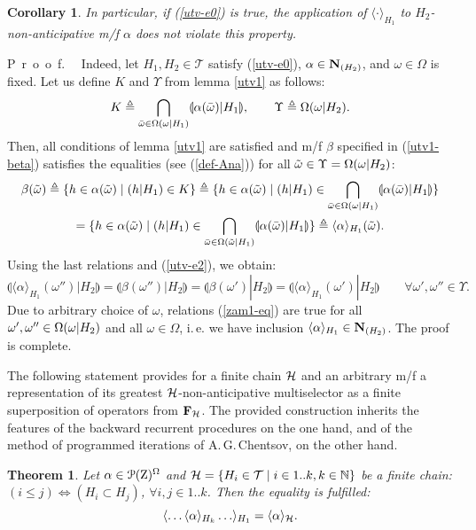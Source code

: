 \documentclass[sn-mathphys,Numbered,pdflatex]{sn-jnl}%
\theoremstyle{thmstyleone}%
\newtheorem{theorem}{Theorem}%
\theoremstyle{thmstyletwo}%
\theoremstyle{thmstylethree}%
\newtheorem{cor}{Corollary}
\renewcommand{\proof}{\par\mbox{P r o o f.}\ \ }
\newcommand{\nint}[2]{{{#1}..{#2}}}%
\renewcommand{\le}{\leqslant}%
\newcommand{\beq}{\begin{equation}}
\newcommand{\eeq}{\end{equation}}
\newcommand{\mydef}{\mathrel{\triangleq}}%
\newcommand{\icP}[1]{\EuScript{P}({#1})}%
\newcommand{\res}[2]{\ensuremath{(#1|#2)}}%
\newcommand{\myimp}{\ensuremath{\mathrel{\Rightarrow}}}%
\newcommand{\myeqv}{\ensuremath{\mathrel{\Leftrightarrow}}}%
\newcommand{\NA}{\ensuremath{\mathbb N}}%
\newcommand{\naOm}{\ensuremath{\Omega}}%
\newcommand{\naZ}{\ensuremath{\mathrm{Z}}}%
\newcommand{\naTc}{\ensuremath{\mathcal{T}}}%
\newcommand{\naOmo}[2]{\naOm\setbox0=\hbox{\text{$#1$}}\ifdim\wd0=0pt\else\res{#1}{#2}\fi}%
\newcommand{\AnaN}[2]{\mathbf{N}_{(#1)}\setbox0=\hbox{\text{$#2$}}\ifdim\wd0=0pt\else\left[{#2}\right]\fi}%
\newcommand{\sres}[2]{\llparenthesis#1|#2\rrparenthesis}%
\newcommand{\Ana}[2]{\ensuremath{\langle{#1}\rangle_{#2}}}%
\newcommand{\fref}[1]{{\rm(\ref{#1})}}   %
\begin{document}
\bigskip

\begin{cor}\label{zam1}
In particular, if \fref{utv-e0} is true, the application of $\Ana\cdot{H_1}$ to $H_2$-non-anticipative m/f $\alpha$ does not violate this property.%
\end{cor}

\proof
Indeed, let $H_1,H_2\in\naTc$ satisfy \fref{utv-e0}, $\alpha\in\AnaN{H_2}{}$, and $\omega\in\naOm$ is fixed.
Let us define $K$ and $\Upsilon$ from lemma \ref{utv1} as follows:
$$
K\mydef\bigcap_{\bar\omega\in\naOmo\omega{H_1}}\sres{\alpha(\bar\omega)}{H_1},\qquad\Upsilon\mydef\naOmo\omega{H_2}.
$$
Then, all conditions of lemma \ref{utv1} are satisfied and m/f $\beta$ specified in \fref{utv1-beta} satisfies the equalities (see \fref{def-Ana}) for all $\tilde\omega\in\Upsilon=\naOmo\omega{H_2}$:
\begin{multline*}
\beta(\tilde\omega)\mydef\{h\in\alpha(\tilde\omega)\mid\res h{H_1}\in K\}\mydef\{h\in\alpha(\tilde\omega)\mid\res h{H_1}\in\bigcap_{\bar\omega\in\naOmo{\omega}{H_1}}\sres{\alpha (\bar\omega)}{H_1}\}\\
=\{h\in\alpha(\tilde\omega)\mid\res h{H_1}\in\bigcap_{\bar\omega\in\naOmo{\tilde\omega}{H_1}}\sres{\alpha (\bar\omega)}{H_1}\}\mydef\Ana\alpha{H_1}(\tilde\omega).
\end{multline*}
Using the last relations and  \fref{utv-e2}, we obtain:
\beq\label{zam1-eq}
\sres{\Ana{\alpha}{H_1}(\omega'')}{H_2}=\sres{\beta(\omega'')}{H_2}=\sres{\beta(\omega')}{H_2}= \sres{\Ana{\alpha}{H_1}(\omega')}{H_2}\qquad\forall\omega',\omega''\in\Upsilon.
\eeq
Due to arbitrary choice of $\omega$, relations \fref{zam1-eq} are true for all $\omega',\omega''\in\naOmo\omega{H_2}$ and all $\omega\in\naOm$, i.\,e. we have inclusion $\Ana{\alpha}{H_1}\in\AnaN{H_2}{}$.
The proof is complete.

\bigskip

The following statement provides for a finite chain ${\cal H}$ and an arbitrary m/f a representation of its greatest ${\cal H}$-non-anticipative multiselector as a finite superposition of operators from ${\bf F}_{\cal H}$.
The provided construction inherits the features of the backward recurrent procedures \cite{NNK:143et,Pontr1967et,Pshenichny:1969et} on the one hand, and of the method of programmed iterations of A.\,G.\,Chentsov, on the other hand.

\begin{theorem}
\label{fix-to-couple-lem}
Let $\alpha\in\icP{\naZ}^\naOm$ and ${\cal H}=\{H_i\in\naTc\mid i\in\nint1k, k\in\NA\}$ be a finite chain: $(i\le j)\myeqv(H_i\subset H_j)$, $\forall i,j\in\nint1k$.
Then the equality is fulfilled:
\beq\label{fix-to-fin}
\Ana{\ldots\Ana\alpha{H_k}\ldots}{H_1}=\Ana\alpha{\cal H}.
\eeq
\end{theorem}
\end{document}
